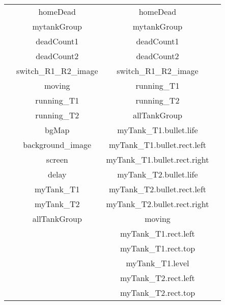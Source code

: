 \documentclass[12pt, titlepage]{article}
\begin{document}
\begin{tabular}[pos]{|c|c|c|c|}
    		 & homeDead & homeDead &  \\
    		 & mytankGroup & mytankGroup &  \\
    		 & deadCount1 & deadCount1 &  \\
    		 & deadCount2 & deadCount2 &  \\
    		 & switch\_R1\_R2\_image & switch\_R1\_R2\_image &  \\
    		 & moving & running\_T1 &  \\
    		 & running\_T1 & running\_T2 &  \\
    		 & running\_T2 & allTankGroup &  \\
    		 & bgMap & myTank\_T1.bullet.life &  \\
    		 & background\_image & myTank\_T1.bullet.rect.left &  \\
    		 & screen & myTank\_T1.bullet.rect.right &  \\
    		 & delay & myTank\_T2.bullet.life &  \\
    		 & myTank\_T1 & myTank\_T2.bullet.rect.left &  \\
    		 & myTank\_T2 & myTank\_T2.bullet.rect.right &  \\
    		 & allTankGroup & moving &  \\
    		 &  & myTank\_T1.rect.left &  \\
    		 &  & myTank\_T1.rect.top &  \\
    		 &  & myTank\_T1.level &  \\
    		 &  & myTank\_T2.rect.left &  \\
    		 &  & myTank\_T2.rect.top &  \\
    		 \hline
			
    	\end{tabular}
        
\end{document}
